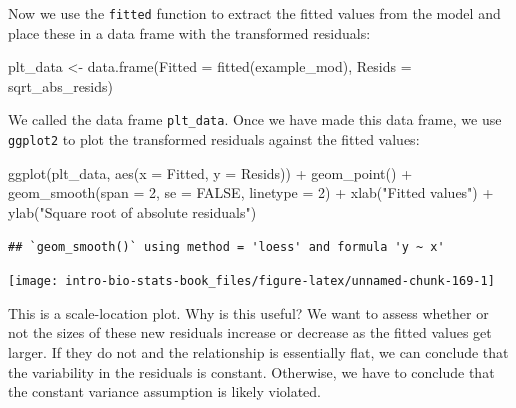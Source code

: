 \documentclass[
]{book}
\newenvironment{Shaded}{\begin{snugshade}}{\end{snugshade}}
\newcommand{\AttributeTok}[1]{\textcolor[rgb]{0.77,0.63,0.00}{#1}}
\newcommand{\ConstantTok}[1]{\textcolor[rgb]{0.00,0.00,0.00}{#1}}
\newcommand{\DecValTok}[1]{\textcolor[rgb]{0.00,0.00,0.81}{#1}}
\newcommand{\FunctionTok}[1]{\textcolor[rgb]{0.00,0.00,0.00}{#1}}
\newcommand{\NormalTok}[1]{#1}
\newcommand{\OtherTok}[1]{\textcolor[rgb]{0.56,0.35,0.01}{#1}}
\newcommand{\SpecialCharTok}[1]{\textcolor[rgb]{0.00,0.00,0.00}{#1}}
\newcommand{\StringTok}[1]{\textcolor[rgb]{0.31,0.60,0.02}{#1}}
\begin{document}
Now we use the \texttt{fitted} function to extract the fitted values from the model and place these in a data frame with the transformed residuals:

\begin{Shaded}
\begin{Highlighting}[]
\NormalTok{plt\_data }\OtherTok{\textless{}{-}} 
  \FunctionTok{data.frame}\NormalTok{(}\AttributeTok{Fitted =} \FunctionTok{fitted}\NormalTok{(example\_mod), }\AttributeTok{Resids =}\NormalTok{ sqrt\_abs\_resids)}
\end{Highlighting}
\end{Shaded}

We called the data frame \texttt{plt\_data}. Once we have made this data frame, we use \texttt{ggplot2} to plot the transformed residuals against the fitted values:

\begin{Shaded}
\begin{Highlighting}[]
\FunctionTok{ggplot}\NormalTok{(plt\_data, }\FunctionTok{aes}\NormalTok{(}\AttributeTok{x =}\NormalTok{ Fitted, }\AttributeTok{y =}\NormalTok{ Resids)) }\SpecialCharTok{+} 
  \FunctionTok{geom\_point}\NormalTok{() }\SpecialCharTok{+} 
  \FunctionTok{geom\_smooth}\NormalTok{(}\AttributeTok{span =} \DecValTok{2}\NormalTok{, }\AttributeTok{se =} \ConstantTok{FALSE}\NormalTok{, }\AttributeTok{linetype =} \DecValTok{2}\NormalTok{) }\SpecialCharTok{+}
  \FunctionTok{xlab}\NormalTok{(}\StringTok{"Fitted values"}\NormalTok{) }\SpecialCharTok{+} \FunctionTok{ylab}\NormalTok{(}\StringTok{"Square root of absolute residuals"}\NormalTok{)}
\end{Highlighting}
\end{Shaded}

\begin{verbatim}
## `geom_smooth()` using method = 'loess' and formula 'y ~ x'
\end{verbatim}

\begin{center}\texttt{[image: intro-bio-stats-book\_files/figure-latex/unnamed-chunk-169-1]} \end{center}

This is a scale-location plot. Why is this useful? We want to assess whether or not the sizes of these new residuals increase or decrease as the fitted values get larger. If they do not and the relationship is essentially flat, we can conclude that the variability in the residuals is constant. Otherwise, we have to conclude that the constant variance assumption is likely violated.
\end{document}
